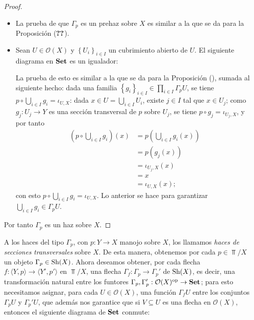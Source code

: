 \begin{proof}
   \begin{itemize}
      \item La prueba de que $\Gamma_p$ es un prehaz sobre $X$ es similar a la que se da para la Proposición ($\Ref{Prop:P1}$).
      \item Sean $U\in \mathcal{O}(X)$ y $\left\lbrace U_i\right\rbrace_{i\in I}$ un cubrimiento abierto de $U$. El siguiente diagrama en $\normalfont{\textbf{Set}}$ es un igualador:
         
         La prueba de esto es similar a la que se da para la Proposición (), sumada al siguiente hecho: dada una familia $\left\lbrace g_i\right\rbrace_{i\in I}\in \prod_{i\in I}\Gamma_p U$, se tiene $p\circ \bigcup_{i\in I} g_i=\iota_{U,X}$: dada $x\in U=\bigcup_{i\in I}U_i$, existe $j\in I$ tal que $x\in U_j$; como $g_j:U_j\to Y$ es una sección transversal de $p$ sobre $U_j$, se tiene $p\circ g_j = \iota_{U_j,X}$, y por tanto
         $$
         \begin{aligned}
            \left(p\circ \bigcup_{i\in I}g_i\right)(x)&=p\left( \bigcup_{i\in I}g_i(x)\right)\\
                                           &=p(g_j(x))\\
                                           &=\iota_{U_j,X}(x)\\
                                           &=x\\
                                           &=\iota_{U,X}(x);
         \end{aligned}
         $$
         con esto $p\circ \bigcup_{i\in I}g_i=\iota_{U,X}$. Lo anterior se hace para garantizar $\bigcup_{i\in I}g_i\in \Gamma_p U$.
   \end{itemize}
   Por tanto $\Gamma_p$ es un haz sobre $X$.
\end{proof}
A los haces del tipo $\Gamma_p$, con $p:Y\to X$ manojo sobre $X$, los llamamos \textit{haces de secciones transversales} sobre $X$. De esta manera, obtenemos por cada $p\in\Top /X$ un objeto $\Gamma_p \in \normalfont{\text{Sh}} (X)$. Ahora deseamos obtener, por cada flecha $f:\langle Y,p \rangle \to \langle Y',p'\rangle$ en $\Top /X$, una flecha $\Gamma_f:\Gamma_p\to\Gamma_p'$ de $\normalfont{\text{Sh}}(X)$, es decir, una transformación natural entre los funtores $\Gamma_p,\Gamma_p':\mathcal{O}(X)^\text{op}\to\normalfont{\textbf{Set}}$; para esto necesitamos asignar, para cada $U\in\mathcal{O}(X)$, una función $\Gamma_f U$ entre los conjuntos $\Gamma_p U$ y $\Gamma_p' U$, que además nos garantice que si $V\subseteq U$ es una flecha en $\mathcal{O}(X)$, entonces el siguiente diagrama de $\normalfont{\textbf{Set}}$ conmute:
